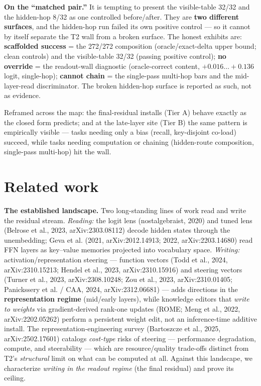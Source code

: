 \documentclass[11pt]{article}
\theoremstyle{plain}
\theoremstyle{definition}
\begin{document}
\textbf{On the ``matched pair.''} It is tempting to present the visible-table 32/32 and the hidden-hop 8/32 as one controlled before/after. They are \textbf{two different surfaces}, and the hidden-hop run failed its own positive control --- so it cannot by itself separate the T2 wall from a broken surface. The honest exhibits are: \textbf{scaffolded success} = the 272/272 composition (oracle/exact-delta upper bound; clean controls) and the visible-table 32/32 (passing positive control); \textbf{no override} = the readout-wall diagnostic (oracle-correct content, $+0.016\dots+0.136$ logit, single-hop); \textbf{cannot chain} = the single-pass multi-hop bars and the mid-layer-read discriminator. The broken hidden-hop surface is reported as such, not as evidence.

Reframed across the map: the final-residual installs (Tier A) behave exactly as the closed form predicts; and at the late-layer site (Tier B) the same pattern is empirically visible --- tasks needing only a bias (recall, key-disjoint co-load) succeed, while tasks needing computation or chaining (hidden-route composition, single-pass multi-hop) hit the wall.

\section{Related work}

\textbf{The established landscape.} Two long-standing lines of work read and write the residual stream. \emph{Reading:} the logit lens (nostalgebraist, 2020) and tuned lens (Belrose et al., 2023, arXiv:2303.08112) decode hidden states through the unembedding; Geva et al. (2021, arXiv:2012.14913; 2022, arXiv:2203.14680) read FFN layers as key--value memories projected into vocabulary space. \emph{Writing:} activation/representation steering --- function vectors (Todd et al., 2024, arXiv:2310.15213; Hendel et al., 2023, arXiv:2310.15916) and steering vectors (Turner et al., 2023, arXiv:2308.10248; Zou et al., 2023, arXiv:2310.01405; Panickssery et al. / CAA, 2024, arXiv:2312.06681) --- adds directions in the \textbf{representation regime} (mid/early layers), while knowledge editors that \emph{write to weights} via gradient-derived rank-one updates (ROME; Meng et al., 2022, arXiv:2202.05262) perform a persistent weight edit, not an inference-time additive install. The representation-engineering survey (Bartoszcze et al., 2025, arXiv:2502.17601) catalogs \emph{cost-type} risks of steering --- performance degradation, compute, and steerability --- which are resource/quality trade-offs distinct from T2's \emph{structural} limit on what can be computed at all. Against this landscape, we characterize \emph{writing in the readout regime} (the final residual) and prove its ceiling.
\end{document}
